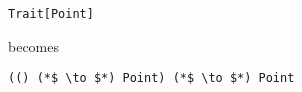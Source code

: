 \begin{lstlisting}
Trait[Point]
\end{lstlisting}

\noindent becomes

\begin{lstlisting}
(() (*$ \to $*) Point) (*$ \to $*) Point
\end{lstlisting}

%
%
%
%
%
%
%
%
%
